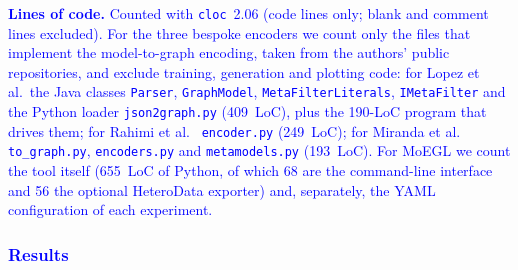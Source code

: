 \documentclass[journal,article,submit,moreauthors,technologies]{Definitions/mdpi}
\newcommand{\rev}[1]{\textcolor{blue}{#1}}
\begin{document}
\rev{\textbf{Lines of code.} Counted with \texttt{cloc}~2.06 (code lines only; blank and comment lines excluded). For the three bespoke encoders we count only the files that implement the model-to-graph encoding, taken from the authors' public repositories, and exclude training, generation and plotting code: for Lopez et al.\ the Java classes \texttt{Parser}, \texttt{GraphModel}, \texttt{MetaFilterLiterals}, \texttt{IMetaFilter} and the Python loader \texttt{json2graph.py} (409~LoC), plus the 190-LoC program that drives them; for Rahimi et al.~\cite{rahimi2023towards} \texttt{encoder.py} (249~LoC); for Miranda et al.~\cite{miranda2024towards} \texttt{to\_graph.py}, \texttt{encoders.py} and \texttt{metamodels.py} (193~LoC). For MoEGL we count the tool itself (655~LoC of Python, of which 68 are the command-line interface and 56 the optional HeteroData exporter) and, separately, the YAML configuration of each experiment.}

\subsubsection{\rev{Results}}
\end{document}
